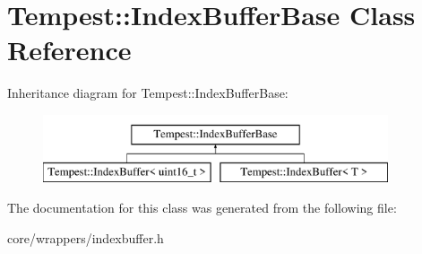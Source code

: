 \hypertarget{class_tempest_1_1_index_buffer_base}{\section{Tempest\+:\+:Index\+Buffer\+Base Class Reference}
\label{class_tempest_1_1_index_buffer_base}
}
Inheritance diagram for Tempest\+:\+:Index\+Buffer\+Base\+:\begin{figure}[H]
\begin{center}
\leavevmode
\includegraphics[height=2.000000cm]{class_tempest_1_1_index_buffer_base}
\end{center}
\end{figure}


The documentation for this class was generated from the following file\+:\begin{DoxyCompactItemize}
\item 
core/wrappers/indexbuffer.\+h\end{DoxyCompactItemize}

